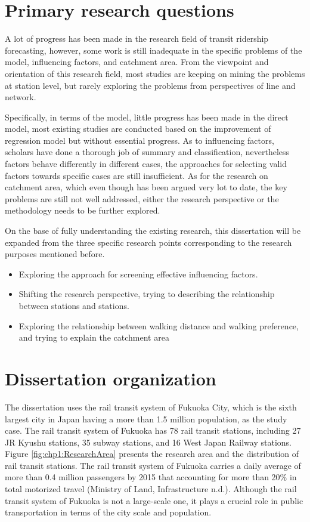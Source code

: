 %
\section{Primary research questions}
A lot of progress has been made in the research field of transit ridership forecasting, however, some work is still inadequate in the specific problems of the model, influencing factors, and catchment area. From the viewpoint and orientation of this research field, most studies are keeping on mining the problems at station level, but rarely exploring the problems from perspectives of line and network. 

Specifically, in terms of the model, little progress has been made in the direct model, most existing studies are conducted based on the improvement of regression model but without essential progress. As to influencing factors, scholars have done a thorough job of summary and classification, nevertheless factors behave differently in different cases, the approaches for selecting valid factors towards specific cases are still insufficient. As for the research on catchment area, which even though has been argued very lot to date, the key problems are still not well addressed, either the research perspective or the methodology needs to be further explored.

On the base of fully understanding the existing research, this dissertation will be expanded from the three specific research points corresponding to the research purposes mentioned before.

\begin{itemize}
	\item Exploring the approach for screening effective influencing factors.
	\item Shifting the research perspective, trying to describing the relationship between stations and stations.
	\item Exploring the relationship between walking distance and walking preference, and trying to explain the catchment area
\end{itemize}

%
\section{Dissertation organization}
The dissertation uses the rail transit system of Fukuoka City, which is the sixth largest city in Japan having a more than 1.5 million population, as the study case. The rail transit system of Fukuoka has 78 rail transit stations, including 27 JR Kyushu stations, 35 subway stations, and 16 West Japan Railway stations. Figure \ref{fig:chp1:ResearchArea} presents the research area and the distribution of rail transit stations. The rail transit system of Fukuoka carries a daily average of more than 0.4 million passengers by 2015 that accounting for more than 20\% in total motorized travel (Ministry of Land, Infrastructure n.d.). Although the rail transit system of Fukuoka is not a large-scale one, it plays a crucial role in public transportation in terms of the city scale and population.

